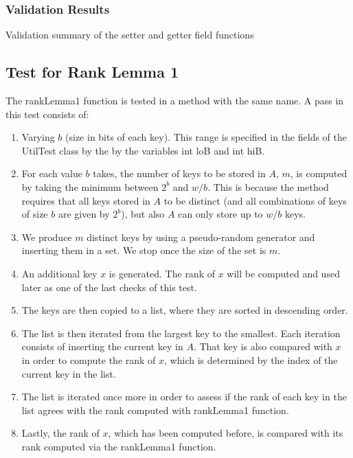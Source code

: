 \subsubsection{Validation Results}

\begin{table}[H]
\centering

\caption{Validation summary of the setter and getter field functions}
\label{tab:setGetFieldValidation}
\end{table}

\subsection{Test for Rank Lemma 1}
The {\ttfamily rankLemma1} function is tested in a method with the same name.
A pass in this test consists of:
\begin{enumerate}
    \item
    Varying $b$ (size in bits of each key). This range is specified in the fields of the {\ttfamily UtilTest} class by the by the variables {\ttfamily int loB} and {\ttfamily int hiB}.
    
    \item
    For each value $b$ takes, the number of keys to be stored in $A$, $m$, is computed by taking the minimum between $2^b$ and $w/b$. This is because the method requires that all keys stored in $A$ to be distinct (and all combinations of keys of size $b$ are given by $2^b$), but also $A$ can only store up to $w/b$ keys.
    
    \item
    We produce $m$ distinct keys by using a pseudo-random generator and inserting them in a set. We stop once the size of the set is $m$.
    
    \item
    An additional key $x$ is generated. The rank of $x$ will be computed and used later as one of the last checks of this test.
    
    \item
    The keys are then copied to a list, where they are sorted in descending order.
    
    \item
    The list is then iterated from the largest key to the smallest. Each iteration consists of inserting the current key in $A$. That key is also compared with $x$ in order to compute the rank of $x$, which is determined by the index of the current key in the list.
    
    \item
    The list is iterated once more in order to assess if the rank of each key in the list agrees with the rank computed with {\ttfamily rankLemma1} function.
    
    \item
    Lastly, the rank of $x$, which has been computed before, is compared with its rank computed via the {\ttfamily rankLemma1} function.
\end{enumerate}

